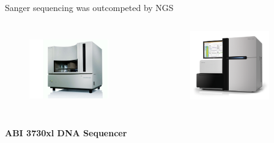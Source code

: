 \documentclass[10pt]{beamer}
\begin{document}
\begin{frame}{Sanger sequencing was outcompeted by NGS}
	\begin{columns}[T,onlytextwidth]
		\begin{figure}
			\includegraphics[width=0.8\textwidth]{./figures/abi3730xl.jpg} \vspace{1em} \\
		\end{figure}
		\begin{figure}
			\includegraphics[width=0.8\textwidth]{./figures/system-carousel-hiseq2500-left.png}
		\end{figure}
	\end{columns}
	\begin{columns}[T,onlytextwidth]
		\begin{exampleblock}{}
			\textbf{ABI 3730xl DNA Sequencer}\\

\end{exampleblock}
\end{columns}
\end{frame}
\end{document}
